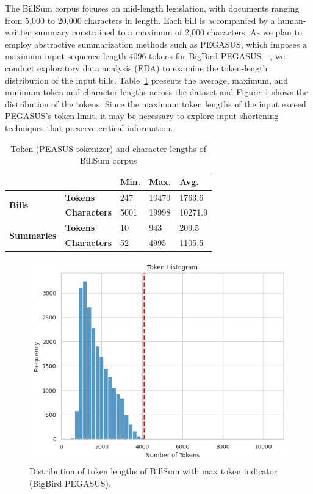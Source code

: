 \documentclass[11pt]{article}
\begin{document}
\indent The BillSum corpus focuses on mid-length legislation, with documents ranging from 5,000 to 20,000 characters in length. Each bill is accompanied by a human-written summary constrained to a maximum of 2,000 characters. As we plan to employ abstractive summarization methods such as PEGASUS, which imposes a maximum input sequence length 4096 tokens for BigBird PEGASUS—\citep{zaheer2021bigbirdtransformerslonger}, we conduct exploratory data analysis (EDA) to examine the token-length distribution of the input bills. Table~\ref{tab:bill_len} presents the average, maximum, and minimum token and character lengths across the dataset and Figure~\ref{fig:token_distr} shows the distribution of the tokens. Since the maximum token lengths of the input exceed PEGASUS's token limit, it may be necessary to explore input shortening techniques that preserve critical information.

\begin{table}[]
\centering
\begin{tabular}{l|l|lll}
                                    &                     & \textbf{Min.} & \textbf{Max.} & \textbf{Avg.} \\ \hline
\multirow{2}{*}{\textbf{Bills}}     & \textbf{Tokens}     & 247           & 10470         & 1763.6        \\
                                    & \textbf{Characters} & 5001          & 19998         & 10271.9       \\ \hline
\multirow{2}{*}{\textbf{Summaries}} & \textbf{Tokens}     & 10            & 943           & 209.5         \\
                                    & \textbf{Characters} & 52            & 4995          & 1105.5       
\end{tabular}
\caption{Token (PEASUS tokenizer) and character lengths of BillSum corpus}
\label{tab:bill_len}
\end{table}

\begin{figure}[ht]
  \centering
  \includegraphics[width=\columnwidth]{token_distr.png}  %
  \caption{Distribution of token lengths of BillSum with max token indicator (BigBird PEGASUS).}
  \label{fig:token_distr}
\end{figure}
\end{document}

